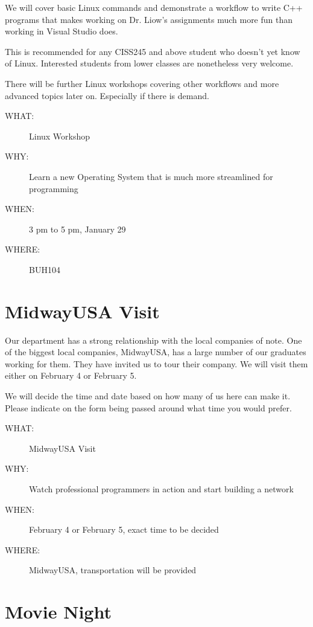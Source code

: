 We will cover basic Linux commands and demonstrate a workflow to write C++
programs that makes working on Dr. Liow's assignments much more fun than
working in Visual Studio does.

This is recommended for any CISS245 and above student who doesn't yet know of
Linux. Interested students from lower classes are nonetheless very welcome.

There will be further Linux workshops covering other workflows and more advanced
topics later on. Especially if there is demand.

\begin{description}
\item[{WHAT:}] Linux Workshop
\item[{WHY:}] Learn a new Operating System that is much more streamlined for programming
\item[{WHEN:}] 3 pm to 5 pm, January 29
\item[{WHERE:}] BUH104
\end{description}


\newpage


\section{MidwayUSA Visit}
\label{sec-5}

Our department has a strong relationship with the local companies of note. One
of the biggest local companies, MidwayUSA, has a large number of our graduates
working for them. They have invited us to tour their company. We will visit
them either on February 4 or February 5. 

We will decide the time and date based on how many of us here can make
it. Please indicate on the form being passed around what time you would prefer.

\begin{description}
\item[{WHAT:}] MidwayUSA Visit
\item[{WHY:}] Watch professional programmers in action and start building a network
\item[{WHEN:}] February 4 or February 5, exact time to be decided
\item[{WHERE:}] MidwayUSA, transportation will be provided
\end{description}


\newpage


\section{Movie Night}
\label{sec-6}

